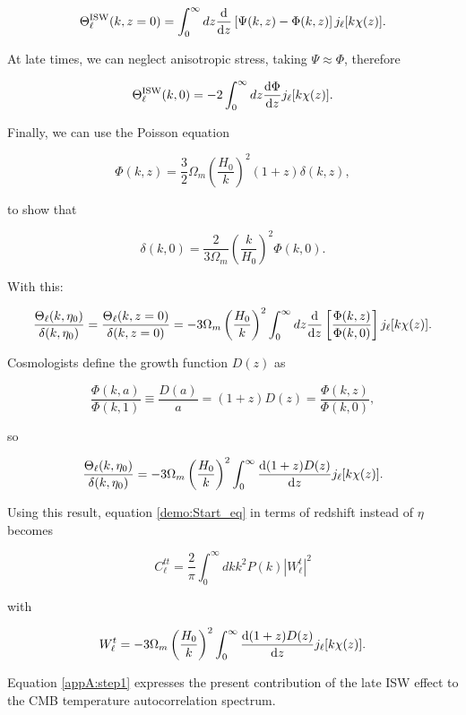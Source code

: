 \documentclass[openany,a4paper,12pt,oneside]{book}
\begin{document}
\begin{spacing}{1.5}
\begin{equation}
	\Theta_\ell^\text{ISW}(k,z=0)=\int_0^\infty dz \dv{}{z}\left[\Psi(k,z)-\Phi(k,z)\right]j_\ell[k\chi(z)].
\end{equation}

At late times, we can neglect anisotropic stress, taking $\Psi\approx \Phi$, therefore

\begin{equation}
	\Theta_\ell^\text{ISW}(k,0)=-2\int_0^\infty dz \dv{\Phi}{z}j_\ell [k\chi(z)].
\end{equation}

Finally, we can use the Poisson equation

\begin{equation}
	\Phi(k,z)=\frac{3}{2}\Omega_m \left(\frac{H_0}{k}\right)^2(1+z)\delta(k,z),
\end{equation}

\noindent to show that

\begin{equation}
	\delta(k,0)=\frac{2}{3\Omega_m}\left(\frac{k}{H_0}\right)^2\Phi(k,0).
\end{equation}

With this:

\begin{equation}
	\frac{\Theta_\ell(k,\eta_0)}{\delta(k,\eta_0)}=\frac{\Theta_\ell(k,z=0)}{\delta(k,z=0)}=-3\Omega_m\left(\frac{H_0}{k}\right)^2\int_0^\infty dz \dv{}{z}\left[\frac{\Phi(k,z)}{\Phi(k,0)}\right]j_\ell[k\chi(z)].
\end{equation}

Cosmologists define the growth function $D(z)$ as

\begin{equation}
	\frac{\Phi(k,a)}{\Phi(k,1)}\equiv\frac{D(a)}{a}=(1+z)D(z)=\frac{\Phi(k,z)}{\Phi(k,0)},
\end{equation}

so

\begin{equation}
	\frac{\Theta_\ell(k,\eta_0)}{\delta(k,\eta_0)}=-3\Omega_m\left(\frac{H_0}{k}\right)^2\int_0^\infty \dv{(1+z)D(z)}{z}j_\ell[k\chi(z)].
\end{equation}

Using this result, equation \eqref{demo:Start_eq} in terms of redshift instead of $\eta$ becomes

\begin{equation}\label{AppA:eq_final}
	C_\ell^{tt}=\frac{2}{\pi}\int_0^\infty dk k^2P(k)|W_\ell^t|^2
\end{equation}

\noindent with 

\begin{equation}
	W_\ell^t=-3\Omega_m\left(\frac{H_0}{k}\right)^2\int_0^\infty \dv{(1+z)D(z)}{z}j_\ell[k\chi(z)].
\end{equation}

Equation \eqref{appA:step1} expresses the present contribution of the late ISW  effect to the CMB temperature autocorrelation spectrum.

\end{spacing}
\endgroup

\printbibliography
\end{document}
